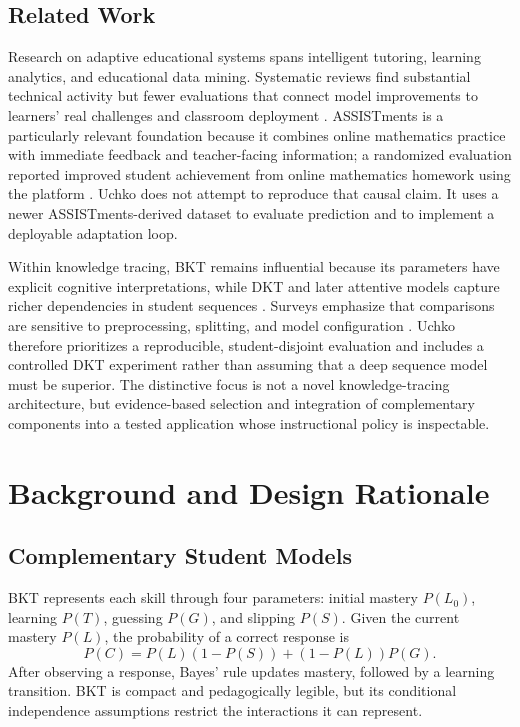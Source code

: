 \documentclass[conference]{IEEEtran}
\begin{document}
\subsection{Related Work}
Research on adaptive educational systems spans intelligent tutoring, learning analytics, and educational data mining. Systematic reviews find substantial technical activity but fewer evaluations that connect model improvements to learners' real challenges and classroom deployment \cite{kabudi2021adaptive,tan2025platforms}. ASSISTments is a particularly relevant foundation because it combines online mathematics practice with immediate feedback and teacher-facing information; a randomized evaluation reported improved student achievement from online mathematics homework using the platform \cite{rochelle2016assistments}. Uchko does not attempt to reproduce that causal claim. It uses a newer ASSISTments-derived dataset to evaluate prediction and to implement a deployable adaptation loop.

Within knowledge tracing, BKT remains influential because its parameters have explicit cognitive interpretations, while DKT and later attentive models capture richer dependencies in student sequences \cite{corbett1994knowledge,piech2015dkt,ghosh2020akt}. Surveys emphasize that comparisons are sensitive to preprocessing, splitting, and model configuration \cite{abdelrahman2023survey}. Uchko therefore prioritizes a reproducible, student-disjoint evaluation and includes a controlled DKT experiment rather than assuming that a deep sequence model must be superior. The distinctive focus is not a novel knowledge-tracing architecture, but evidence-based selection and integration of complementary components into a tested application whose instructional policy is inspectable.

\section{Background and Design Rationale}
\subsection{Complementary Student Models}
BKT represents each skill through four parameters: initial mastery $P(L_0)$, learning $P(T)$, guessing $P(G)$, and slipping $P(S)$. Given the current mastery $P(L)$, the probability of a correct response is
\begin{equation}
P(C)=P(L)(1-P(S))+(1-P(L))P(G).
\end{equation}
After observing a response, Bayes' rule updates mastery, followed by a learning transition. BKT is compact and pedagogically legible, but its conditional independence assumptions restrict the interactions it can represent.
\end{document}
